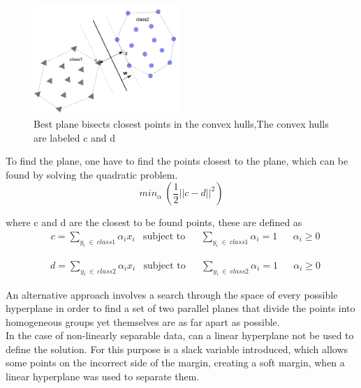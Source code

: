 \begin{figure}[H]
\centering
\includegraphics[width = 0.5\textwidth]{img/convex_hull.png}
\caption{Best plane bisects closest points in the convex hulls,The convex hulls 
are labeled c and d}
\label{fig::convex_hull}
\end{figure}  

To find  the plane, one have to find the points closest to the plane, which can 
be found by solving the quadratic problem. \\ 

\begin{equation}
min_\alpha~\left(\frac{1}{2} ||c-d||^2\right)
\end{equation}

where c and d are the closest to be found points, these are defined as 
\begin{equation}
\begin{aligned}
&c = \sum_{y_i~\in~class1} \alpha_ix_i  
& \text{subject to}
&& \sum_{y_i~\in~class1}\alpha_i =1 
&& \alpha_i \geq 0
\end{aligned} 
\end{equation}

\begin{equation}
\begin{aligned}
&d = \sum_{y_i~\in~class2} \alpha_ix_i  
& \text{subject to}
&& \sum_{y_i~\in~class2}\alpha_i =1 
&& \alpha_i \geq 0
\end{aligned} 
\end{equation}


An alternative approach involves a search through the space of every possible 
hyperplane in order to find a set of two parallel planes that divide the points 
into homogeneous groups yet themselves are as far apart as possible.\\


In the case of non-linearly separable data, can a linear hyperplane not be used 
to define the solution. 
For this purpose is a slack variable introduced, which allows some points on the 
incorrect side of the margin, creating a soft margin, when a linear hyperplane 
was used to separate them.\\

